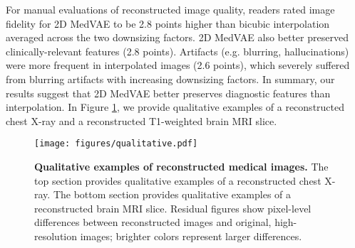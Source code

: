 For manual evaluations of reconstructed image quality, readers rated image fidelity for 2D MedVAE to be 2.8 points higher than bicubic interpolation averaged across the two downsizing factors. 2D MedVAE also better preserved clinically-relevant features (2.8 points). Artifacts (e.g. blurring, hallucinations) were more frequent in interpolated images (2.6 points), which severely suffered from blurring artifacts with increasing downsizing factors. In summary, our results suggest that 2D MedVAE better preserves diagnostic features than interpolation. In Figure \ref{fig:qualitative}, we provide qualitative examples of a reconstructed chest X-ray and a reconstructed T1-weighted brain MRI slice. 


\begin{figure}[h]
\centering
\texttt{[image: figures/qualitative.pdf]}
\caption{\textbf{Qualitative examples of reconstructed medical images.} The top section provides qualitative examples of a reconstructed chest X-ray. The bottom section provides qualitative examples of a reconstructed brain MRI slice. Residual figures show pixel-level differences between reconstructed images and original, high-resolution images; brighter colors represent larger differences.}
\label{fig:qualitative}
\end{figure}